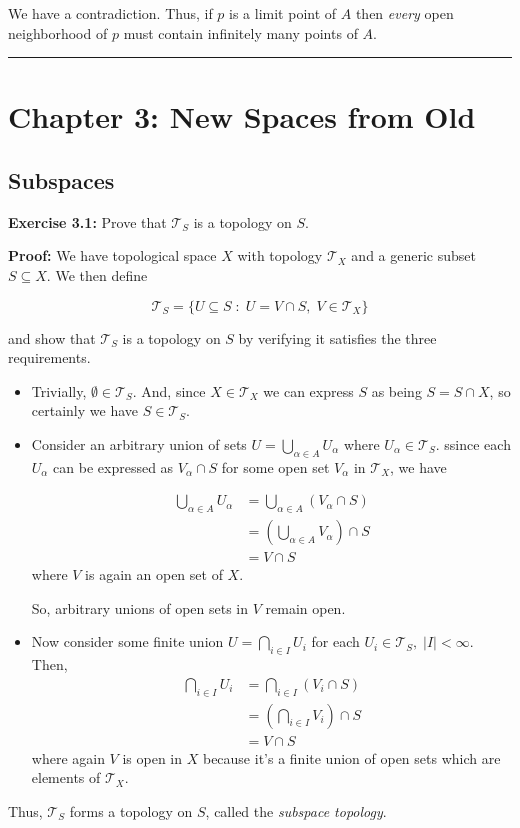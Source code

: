 \documentclass{article}
\newcommand*{\T}{\mathcal T}
\begin{document}
\vskip 0.5cm

We have a contradiction. Thus, if $p$ is a limit point of $A$ then \emph{every} open neighborhood of $p$ must contain infinitely many points of $A$.
\vskip 0.5cm
\hrule
\vskip 0.5cm

\pagebreak
\section{Chapter 3: New Spaces from Old}

\subsection{Subspaces}

\textbf{Exercise 3.1:} Prove that $\T_S$ is a topology on $S$.

\vskip 0.5cm

\textbf{Proof:} We have topological space $X$ with topology $\T_X$ and a generic subset $S \subseteq X$. We then define

\[ \T_S = \{ U \subseteq S \; : \; U = V \cap S,\; V \in \T_X \} \]

and show that $\T_S$ is a topology on $S$ by verifying it satisfies the three requirements. 

\vskip 0.5cm

\begin{itemize}
  \item Trivially, $\emptyset \in \T_S$. And, since $X \in \T_X$ we can express $S$ as being $S = S \cap X$, so certainly we have $S \in \T_S$.
  
  \vskip 0.5cm
  \item Consider an arbitrary union of sets $U = \bigcup_{\alpha \in A} U_{\alpha}$ where $U_{\alpha} \in \T_S$. ssince each $U_{\alpha}$ can be expressed as $V_{\alpha} \cap S$ for some open set $V_{\alpha}$ in $\T_X$, we have 
  
  \begin{align*}
    \bigcup_{\alpha \in A} U_{\alpha} &= \bigcup_{\alpha \in A} (V_{\alpha} \cap S) \\
    &= \left( \bigcup_{\alpha \in A} V_{\alpha} \right) \cap S \\
    &= V \cap S
  \end{align*}
  where $V$ is again an open set of $X$.

  So, arbitrary unions of open sets in $V$ remain open.
  
  \vskip 0.5cm
  \item Now consider some finite union $U = \bigcap_{i \in I} U_i$ for each $U_i \in \T_S, \; |I| < \infty$. Then,
  \begin{align*}
    \bigcap_{i \in I} U_i &= \bigcap_{i \in I} (V_i \cap S) \\
    &= \left(\bigcap_{i \in I} V_i\right) \cap S \\
    &= V \cap S
  \end{align*}
  where again $V$ is open in $X$ because it's a finite union of open sets which are elements of $\T_X$.
\end{itemize}
Thus, $\T_S$ forms a topology on $S$, called the \emph{subspace topology}.
\end{document}
